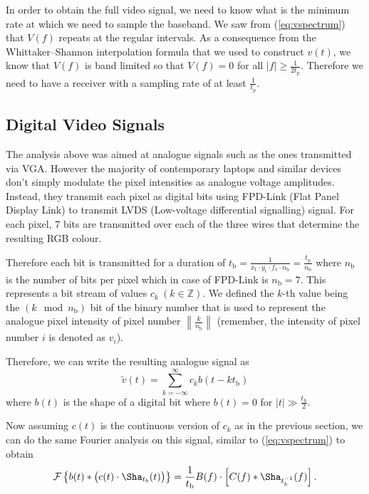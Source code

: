 \documentclass[a4paper,12pt,twoside,openright]{report}
\begin{document}
In order to obtain the full video signal, we need to know what is the minimum rate at which we need to sample the baseband. We saw from (\ref{eq:vspectrum}) that $V(f)$ repeats at the regular intervals. As a consequence from the Whittaker--Shannon interpolation formula that we used to construct $v(t)$, we know that $V(f)$ is band limited so that $V(f) = 0$ for all $|f| \geq \frac{1}{2 t_\text{p}}$. Therefore we need to have a receiver with a sampling rate of at least $\frac{1}{t_\text{p}}$.

\subsection{Digital Video Signals}

The analysis above was aimed at analogue signals such as the ones transmitted via VGA. However the majority of contemporary laptops and similar devices don't simply modulate the pixel intensities as analogue voltage amplitudes. Instead, they transmit each pixel as digital bits using FPD-Link (Flat Panel Display Link) to transmit LVDS (Low-voltage differential signalling) signal. For each pixel, 7 bits are transmitted over each of the three wires that determine the resulting RGB colour.

Therefore each bit is transmitted for a duration of $t_\text{b}=\frac{1}{x_\text{t} \cdot y_\text{t} \cdot f_\text{v} \cdot n_\text{b}}=\frac{t_\text{p}}{n_\text{b}}$ where $n_\text{b}$ is the number of bits per pixel which in case of FPD-Link is $n_\text{b} = 7$. This represents a bit stream of values $c_{k}\ (k \in \mathbb{Z})$. We defined the $k$-th value being the $(k \mod n_\text{b})$ bit of the binary number that is used to represent the analogue pixel intensity of pixel number $\left\| \frac{k}{n_\text{b}} \right\|$ (remember, the intensity of pixel number $i$ is denoted as $v_{i}$).

Therefore, we can write the resulting analogue signal as
$$\tilde{v}(t) = \sum\limits_{k=-\infty}^{\infty} c_{k} b(t-k t_\text{b})$$
where $b(t)$ is the shape of a digital bit where $b(t)=0$ for $|t| \gg \frac{t_\text{b}}{2}$.

Now assuming $c(t)$ is the continuous version of $c_{k}$ as in the previous section, we can do the same Fourier analysis on this signal, similar to (\ref{eq:vspectrum}) to obtain
\begin{equation} 
\mathcal{F} \left\{ b(t) \ast \big( c(t) \cdot \Sha_{t_{b}} (t) \big) \right\} = \\
\frac{1}{t_\text{b}} B(f) \cdot  \left[ C(f) \ast 
\Sha_{t_{b}^{-1}}(f) 
\right] .
\end{equation}
\end{document}
